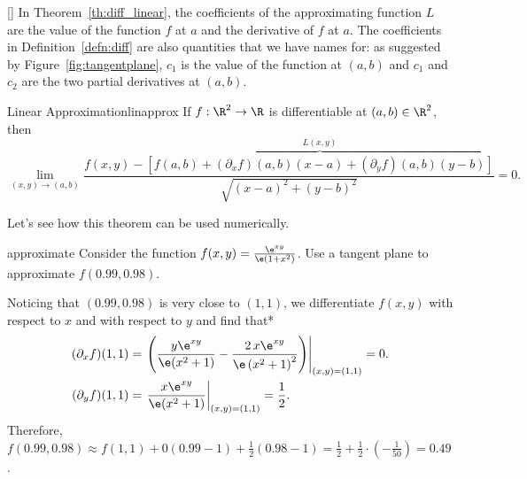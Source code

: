 \documentclass[indent]{watsonbook}
\begin{document}
{\begin{insetfigure}{\usebox{\asybox}}[]
In Theorem~\ref{th:diff_linear}, the coefficients of the approximating
function $L$ are the value of the function $f$ at $a$ and the
derivative of $f$ at $a$. The coefficients in
Definition~\ref{defn:diff} are also quantities that we have names for:
as suggested by Figure~\ref{fig:tangentplane}, $c_1$ is the value of
the function at $(a,b)$ and $c_1$ and $c_2$ are the two partial
derivatives at $(a,b)$.
\end{insetfigure}

\vspace{12pt}

\begin{theo}{Linear Approximation}{linapprox}
  If $f: \R^2 \to \R$ is differentiable at $(a,b) \in \R^2$, then
  \[
    \lim_{(x,y) \to (a,b)}\frac{f(x,y) - \overbrace{\left[f(a,b) + (\partial_x
          f)(a,b)(x-a) + (\partial_y
          f)(a,b)(y-b)\right]}^{L(x,y)}}{\sqrt{(x-a)^2 + (y-b)^2}} = 0.
  \]
\end{theo} \bang{-2cm}

Let's see how this theorem can be used numerically.

\begin{example}{}{approximate}
  Consider the function $f(x,y) = \frac{\e^{xy}}{\e(1+x^2)}$. Use a
  tangent plane to approximate $f(0.99,0.98)$.
\end{example}

\begin{solution}
  Noticing that $(0.99,0.98)$ is very close to $(1,1)$, we
  differentiate $f(x,y)$ with respect to $x$ and with respect to $y$ and
  find that* 
  \begin{align*}
    (\partial_x f)(1,1) &= \left.\left(
                          \frac{y \e^{x y}}{\e(x^{2} + 1)} -
                          \frac{2 \, x \e^{xy}}{{\e\left(x^{2} +
                          1\right)}^{2}}\right)\right|_{(x,y)
                          =(1,1)} = 0. \\
    (\partial_y f)(1,1) &=    \left.\frac{x \e^{x y}}{\e(x^{2} +
                          1)}\right|_{(x,y) = (1,1)} = \frac{1}{2}.
  \end{align*}
  Therefore, $f(0.99,0.98) \approx f(1,1) + 0(0.99-1) +
  \frac{1}{2}(0.98-1) = \frac{1}{2} + \frac{1}{2} \cdot
  (-\frac{1}{50}) = 0.49$. 
\end{solution}

}
\end{document}
